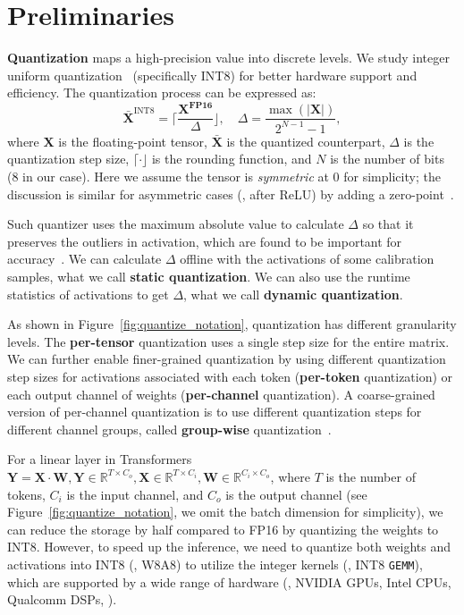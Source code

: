 \section{Preliminaries}
\label{sec:quantization}
\textbf{Quantization} maps a high-precision value into discrete levels. 
We study integer uniform quantization~\cite{jacob2018quantization} (specifically INT8) for better hardware support and efficiency. The quantization process can be expressed as:
\begin{equation}
    \label{eqn:quantizer}
    \bar{\mathbf{X}}^{\text{INT8}} =  \lceil\frac{\mathbf{X^{\text{FP16}}}}{\Delta}\rfloor, \quad \Delta=\frac{\max(|\mathbf{X}|)}{2^{N-1}-1},
\end{equation}
where $\mathbf{X}$ is the floating-point tensor, $\bar{\mathbf{X}}$ is the quantized counterpart, $\Delta$ is the quantization step size, $\lceil\cdot\rfloor$ is the rounding function, and $N$ is the number of bits (8 in our case). Here we assume the tensor is \emph{symmetric} at 0 for simplicity; the discussion is similar for asymmetric cases (\eg, after ReLU) by adding a zero-point~\cite{jacob2018quantization}.

Such quantizer uses the maximum absolute value to calculate $\Delta$ so that it preserves the outliers in activation, which are found to be important for accuracy~\cite{dettmers2022llmint8}. We can calculate $\Delta$ offline with the activations of some calibration samples, what we call \textbf{static quantization}. We can also use the runtime statistics of activations to get $\Delta$, what we call \textbf{dynamic quantization}.

As shown in Figure~\ref{fig:quantize_notation}, quantization has different granularity levels. The \textbf{per-tensor} quantization uses a single step size for the entire matrix. We can further enable finer-grained quantization by using different quantization step sizes for activations associated with each token (\textbf{per-token} quantization) or each output channel of weights (\textbf{per-channel} quantization). A coarse-grained version of per-channel quantization is to use different quantization steps for different channel groups, called \textbf{group-wise} quantization~\cite{shen2020q,zeroquant}.

For a linear layer in Transformers~\cite{vaswani2017attention}
$\mathbf{Y}=\mathbf{X}\cdot \mathbf{W}, \mathbf{Y}\in\mathbb{R}^{T\times C_o}, \mathbf{X}\in\mathbb{R}^{T\times C_i}, \mathbf{W}\in\mathbb{R}^{C_i\times C_o}$,
where  $T$ is the number of tokens, $C_i$ is the input channel, and $C_o$ is the output channel (see Figure~\ref{fig:quantize_notation}, we omit the batch dimension for simplicity), we can reduce the storage by half compared to FP16 by quantizing the weights to INT8. However, to speed up the inference, we need to quantize both weights and activations into INT8 (\ie, W8A8) to utilize the integer kernels (\eg, INT8 \texttt{GEMM}), which are supported by a wide range of hardware (\eg, NVIDIA GPUs, Intel CPUs, Qualcomm DSPs, \etc).

